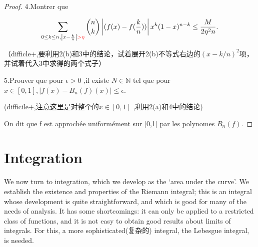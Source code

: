 \documentclass[12pt]{book}
\theoremstyle{definition}\newtheorem{dfn}{Définition}[chapter]
\theoremstyle{plain}\newtheorem{thm}{Théorème}[chapter]
\theoremstyle{plain}\newtheorem{prp}{Proposition}[chapter]
\theoremstyle{plain}\newtheorem{lem}{\bf Lemme}[chapter]
\theoremstyle{plain}\newtheorem{axm}{\bf Axiome}[chapter]
\theoremstyle{plain}\newtheorem{lmm}{\bf Lemme}[chapter]
\theoremstyle{plain}\newtheorem{exm}{\bf Example}[chapter]
\theoremstyle{plain}\newtheorem{cor}{\bf Corollaire}[chapter]
\theoremstyle{remark}\newtheorem{rem}{Remarque}[chapter]
\begin{document}
\begin{proof}
4.Montrer que 

$$\sum_{0\le k\le n, \left | x-\frac{k}{n} \right | \color{red}{>}\eta}\binom{n}{k}\left|(f(x)-f(\frac{k}{n}))\right|x^k(1-x)^{n-k}\le\frac{M}{2\eta^2 n}.$$

（difficle+,要利用2(b)和3中的结论，试着展开2(b)不等式右边的$(x-k/n)^2$项，并试着代入3中求得的两个式子）

5.Prouver que pour $\epsilon>0$ ,il existe $N\in \mathbb N$ tel que pour $x\in [0,1],\left|f(x)-B_{n}(f)(x)\right|\le \epsilon.$

(difficile+,注意这里是对整个的$x\in[0,1]$ ,利用2(a)和4中的结论)

On dit que f est approchée uniformément sur [0,1] par les polynomes $B_{n}(f)$.
\end{proof}





\chapter{Integration}
We now turn to integration, which we develop as the ‘area under the curve’. We establish the existence and properties of the Riemann integral; this is an integral whose development is quite straightforward, and which is good for many of the needs of analysis. It has some shortcomings: it can only be applied to a restricted class of functions, and it is not easy to obtain good results about limits of integrals. For this, a more sophisticated(复杂的) integral, the Lebesgue integral, is needed.
\end{document}
